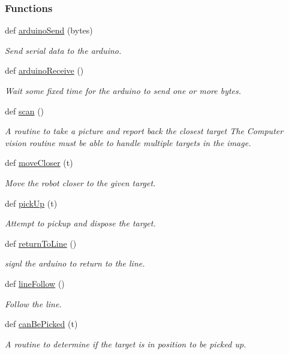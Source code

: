 \subsubsection*{Functions}
\begin{DoxyCompactItemize}
\item 
def \mbox{\hyperlink{namespaceSyringenator_ae7978d5b84170226249d8de2e204e762}{arduino\+Send}} (bytes)
\begin{DoxyCompactList}\small\item\em Send serial data to the arduino. \end{DoxyCompactList}\item 
def \mbox{\hyperlink{namespaceSyringenator_a1c5a8cf020e400c8c0337977a5b6d921}{arduino\+Receive}} ()
\begin{DoxyCompactList}\small\item\em Wait some fixed time for the arduino to send one or more bytes. \end{DoxyCompactList}\item 
def \mbox{\hyperlink{namespaceSyringenator_aff01237d3ff3e33f0ffc32927d813df0}{scan}} ()
\begin{DoxyCompactList}\small\item\em A routine to take a picture and report back the closest target The Computer vision routine must be able to handle multiple targets in the image. \end{DoxyCompactList}\item 
def \mbox{\hyperlink{namespaceSyringenator_a6aecf5518c352d012eb1422d9970146d}{move\+Closer}} (t)
\begin{DoxyCompactList}\small\item\em Move the robot closer to the given target. \end{DoxyCompactList}\item 
def \mbox{\hyperlink{namespaceSyringenator_a9409dbfa8ede969288bb659ef23befb6}{pick\+Up}} (t)
\begin{DoxyCompactList}\small\item\em Attempt to pickup and dispose the target. \end{DoxyCompactList}\item 
def \mbox{\hyperlink{namespaceSyringenator_afe04905c8a4a9d077457422866633203}{return\+To\+Line}} ()
\begin{DoxyCompactList}\small\item\em signl the arduino to return to the line. \end{DoxyCompactList}\item 
def \mbox{\hyperlink{namespaceSyringenator_a824ef6e71bc0975483435ffbdd58cb3e}{line\+Follow}} ()
\begin{DoxyCompactList}\small\item\em Follow the line. \end{DoxyCompactList}\item 
def \mbox{\hyperlink{namespaceSyringenator_acb08d40f080a03cb4e7a43ee3ab4854b}{can\+Be\+Picked}} (t)
\begin{DoxyCompactList}\small\item\em A routine to determine if the target is in position to be picked up. \end{DoxyCompactList}\end{DoxyCompactItemize}
